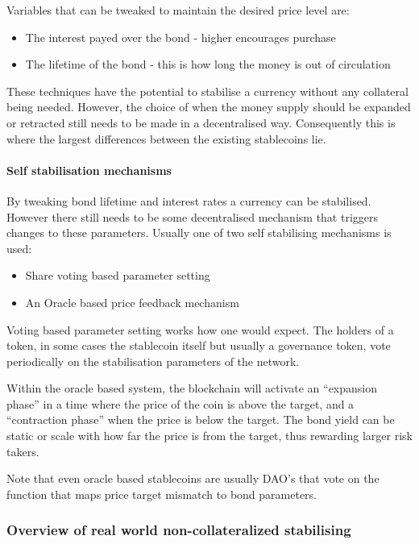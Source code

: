 \documentclass[english,]{IEEEtran}
\providecommand{\tightlist}{%
  \setlength{\itemsep}{0pt}\setlength{\parskip}{0pt}}
\let\oldparagraph\paragraph
\renewcommand{\paragraph}[1]{\oldparagraph{#1}\mbox{}}
\begin{document}
Variables that can be tweaked to maintain the desired price level are:

\begin{itemize}
\tightlist
\item
  The interest payed over the bond - higher encourages purchase
\item
  The lifetime of the bond - this is how long the money is out of
  circulation
\end{itemize}

These techniques have the potential to stabilise a currency without any
collateral being needed. However, the choice of when the money supply
should be expanded or retracted still needs to be made in a
decentralised way. Consequently this is where the largest differences
between the existing stablecoins lie.

\paragraph{Self stabilisation
mechanisms}\label{self-stabilisation-mechanisms}

By tweaking bond lifetime and interest rates a currency can be
stabilised. However there still needs to be some decentralised mechanism
that triggers changes to these parameters. Usually one of two self
stabilising mechanisms is used:

\begin{itemize}
\tightlist
\item
  Share voting based parameter setting
\item
  An Oracle based price feedback mechanism
\end{itemize}

Voting based parameter setting works how one would expect. The holders
of a token, in some cases the stablecoin itself but usually a governance
token, vote periodically on the stabilisation parameters of the network.

Within the oracle based system, the blockchain will activate an
``expansion phase'' in a time where the price of the coin is above the
target, and a ``contraction phase'' when the price is below the target.
The bond yield can be static or scale with how far the price is from the
target, thus rewarding larger risk takers.

Note that even oracle based stablecoins are usually DAO's that vote on
the function that maps price target mismatch to bond parameters.

\subsubsection{Overview of real world non-collateralized
stabilising}\label{overview-of-real-world-non-collateralized-stabilising}
\end{document}
